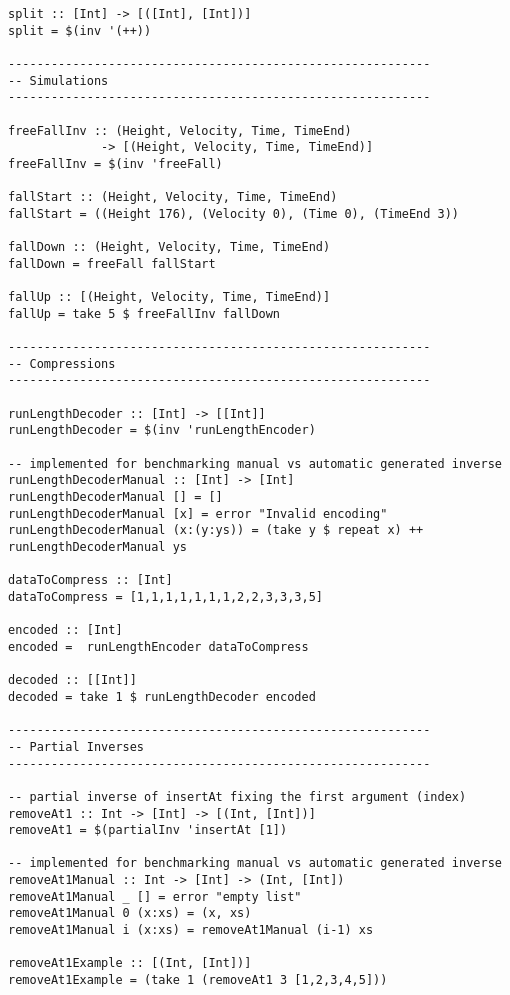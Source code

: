 \begin{verbatim}
split :: [Int] -> [([Int], [Int])]
split = $(inv '(++))

-----------------------------------------------------------
-- Simulations
-----------------------------------------------------------

freeFallInv :: (Height, Velocity, Time, TimeEnd)
             -> [(Height, Velocity, Time, TimeEnd)]
freeFallInv = $(inv 'freeFall)

fallStart :: (Height, Velocity, Time, TimeEnd)
fallStart = ((Height 176), (Velocity 0), (Time 0), (TimeEnd 3))

fallDown :: (Height, Velocity, Time, TimeEnd)
fallDown = freeFall fallStart

fallUp :: [(Height, Velocity, Time, TimeEnd)]
fallUp = take 5 $ freeFallInv fallDown

-----------------------------------------------------------
-- Compressions
-----------------------------------------------------------

runLengthDecoder :: [Int] -> [[Int]]
runLengthDecoder = $(inv 'runLengthEncoder)

-- implemented for benchmarking manual vs automatic generated inverse
runLengthDecoderManual :: [Int] -> [Int]
runLengthDecoderManual [] = []
runLengthDecoderManual [x] = error "Invalid encoding"
runLengthDecoderManual (x:(y:ys)) = (take y $ repeat x) ++ runLengthDecoderManual ys

dataToCompress :: [Int]
dataToCompress = [1,1,1,1,1,1,1,2,2,3,3,3,5]

encoded :: [Int]
encoded =  runLengthEncoder dataToCompress

decoded :: [[Int]]
decoded = take 1 $ runLengthDecoder encoded

-----------------------------------------------------------
-- Partial Inverses
-----------------------------------------------------------

-- partial inverse of insertAt fixing the first argument (index)
removeAt1 :: Int -> [Int] -> [(Int, [Int])]
removeAt1 = $(partialInv 'insertAt [1])

-- implemented for benchmarking manual vs automatic generated inverse
removeAt1Manual :: Int -> [Int] -> (Int, [Int])
removeAt1Manual _ [] = error "empty list"
removeAt1Manual 0 (x:xs) = (x, xs)
removeAt1Manual i (x:xs) = removeAt1Manual (i-1) xs

removeAt1Example :: [(Int, [Int])]
removeAt1Example = (take 1 (removeAt1 3 [1,2,3,4,5]))
\end{verbatim}

